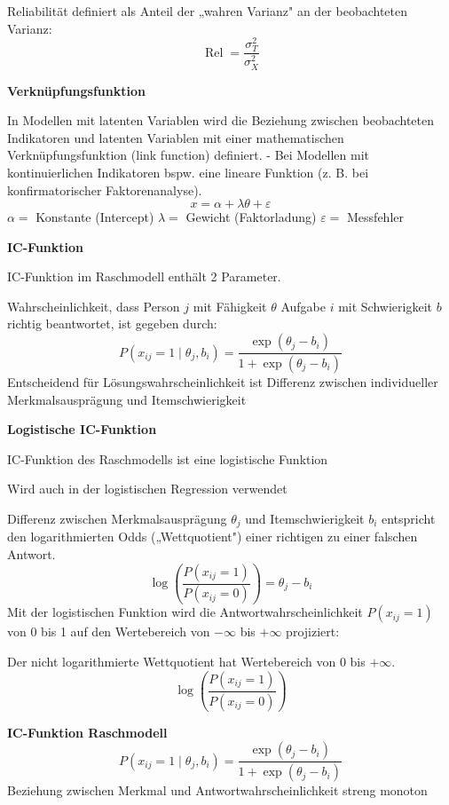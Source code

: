 \documentclass[10pt, letterpaper]{article}
\begin{document}
Reliabilität definiert als Anteil der „wahren Varianz" an der beobachteten Varianz:
$$
\operatorname{Rel}=\frac{\sigma_T^2}{\sigma_X^2}
$$


\textbf{Verknüpfungsfunktion} 

In Modellen mit latenten Variablen wird die Beziehung zwischen beobachteten Indikatoren und latenten Variablen mit einer mathematischen Verknüpfungsfunktion (link function) definiert.
- Bei Modellen mit kontinuierlichen Indikatoren bspw. eine lineare Funktion (z. B. bei konfirmatorischer Faktorenanalyse).
$$
x=\alpha+\lambda \theta+\varepsilon
$$
$\alpha=$ Konstante (Intercept)
$\lambda=$ Gewicht (Faktorladung)
$\varepsilon=$ Messfehler 

\vspace{0.4cm}

\textbf{IC-Funktion}

IC-Funktion im Raschmodell enthält 2 Parameter.

Wahrscheinlichkeit, dass Person $j$ mit Fähigkeit $\theta$ Aufgabe $i$ mit Schwierigkeit $b$ richtig beantwortet, ist gegeben durch:
$$
P\left(x_{i j}=1 \mid \theta_j, b_i\right)=\frac{\exp \left(\theta_j-b_i\right)}{1+\exp \left(\theta_j-b_i\right)}
$$
Entscheidend für Lösungswahrscheinlichkeit ist Differenz zwischen individueller Merkmalsausprägung und Itemschwierigkeit
\vspace{0.4cm}

\textbf{Logistische IC-Funktion}

IC-Funktion des Raschmodells ist eine logistische Funktion

Wird auch in der logistischen Regression verwendet

Differenz zwischen Merkmalsausprägung $\theta_j$ und Itemschwierigkeit $b_i$ entspricht den logarithmierten Odds („Wettquotient") einer richtigen zu einer falschen Antwort.
$$
\log \left(\frac{P\left(x_{i j}=1\right)}{P\left(x_{i j}=0\right)}\right)=\theta_j-b_i
$$
Mit der logistischen Funktion wird die Antwortwahrscheinlichkeit $P\left(x_{i j}=1\right)$ von 0 bis 1 auf den Wertebereich von $-\infty$ bis $+\infty$ projiziert:

Der nicht logarithmierte Wettquotient hat Wertebereich von 0 bis $+\infty$.
$$
\log \left(\frac{P\left(x_{i j}=1\right)}{P\left(x_{i j}=0\right)}\right)
$$

\textbf{IC-Funktion Raschmodell}
$$
P\left(x_{i j}=1 \mid \theta_j, b_i\right)=\frac{\exp \left(\theta_j-b_i\right)}{1+\exp \left(\theta_j-b_i\right)}
$$
Beziehung zwischen Merkmal und Antwortwahrscheinlichkeit streng monoton
\end{document}
